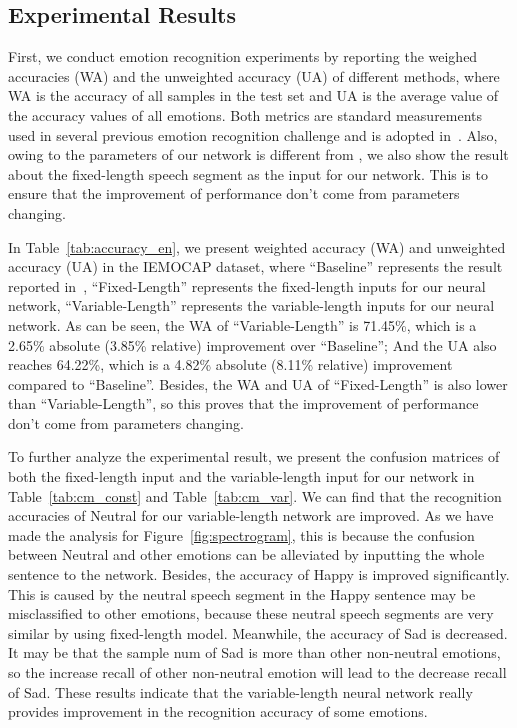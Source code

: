 \documentclass[a4paper]{article}
\begin{document}
\subsection{Experimental Results}
\label{ssec:experimental results}
First, we conduct emotion recognition experiments by reporting the weighed accuracies (WA) and the unweighted accuracy (UA) of different methods, where WA is the accuracy of all samples in the test set and UA is the average value of the accuracy values of all emotions. Both metrics are standard measurements used in several previous emotion recognition challenge and is adopted in~\cite{satt2017}. Also, owing to the parameters of our network is different from \cite{satt2017}, we also show the result about the fixed-length speech segment as the input for our network. This is to ensure that the improvement of performance don't come from parameters changing.

In Table~\ref{tab:accuracy_en}, we present weighted accuracy (WA) and unweighted accuracy (UA) in the IEMOCAP dataset, where ``Baseline'' represents the result reported in~\cite{satt2017}, ``Fixed-Length'' represents the fixed-length inputs for our neural network, ``Variable-Length'' represents the variable-length inputs for our neural network. As can be seen, the WA of ``Variable-Length'' is 71.45\%, which is a 2.65\% absolute (3.85\% relative) improvement over ``Baseline''; And the UA also reaches 64.22\%, which is a 4.82\% absolute (8.11\% relative) improvement compared to ``Baseline''. Besides, the WA and UA of ``Fixed-Length'' is also lower than ``Variable-Length'', so this proves that the improvement of performance don't come from parameters changing.

To further analyze the experimental result, we present the confusion matrices of both the fixed-length input and the variable-length input for our network in Table~\ref{tab:cm_const} and Table~\ref{tab:cm_var}. We can find that the recognition accuracies of Neutral for our variable-length network are improved. As we have made the analysis for Figure~\ref{fig:spectrogram}, this is because the confusion between Neutral and other emotions can be alleviated by inputting the whole sentence to the network. Besides, the accuracy of Happy is improved significantly. This is caused by the neutral speech segment in the Happy sentence may be misclassified to other emotions, because these neutral speech segments are very similar by using fixed-length model. Meanwhile, the accuracy of Sad is decreased. It may be that the sample num of Sad is more than other non-neutral emotions, so the increase recall of other non-neutral emotion will lead to the decrease recall of Sad. These results indicate that the variable-length neural network really provides improvement in the recognition accuracy of some emotions.
\end{document}
